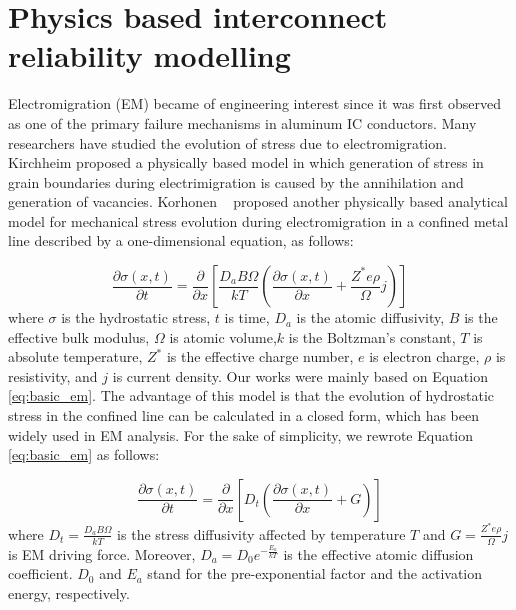 \section{Physics based interconnect reliability modelling} 
\label{sec:reliability_modeling}

Electromigration (EM) became of engineering interest since it was first observed as one of the primary failure mechanisms in aluminum IC conductors. Many researchers have studied the evolution of stress due to electromigration. Kirchheim proposed a physically based model in which generation of stress in grain boundaries during electrimigration is caused by the annihilation and generation of vacancies. Korhonen ~\cite{Korhonen:jap1993} proposed another physically based analytical model for mechanical stress evolution during electromigration in a confined metal line described by a one-dimensional equation, as follows:

\begin{equation}
\label{eq:basic_em}
\frac{\partial \sigma(x,t)}{\partial t}=\frac{\partial }{\partial x}\left[\frac{D_aB\Omega}{kT}\left(\frac{\partial \sigma(x,t)}{\partial x}+\frac{Z^*e\rho}{\Omega}j\right)\right]
\end{equation}
where $\sigma$ is the hydrostatic stress, $t$ is time, $D_a$ is the atomic diffusivity, $B$ is the effective bulk modulus, $\Omega$ is atomic volume,$k$ is the Boltzman's constant, $T$ is absolute temperature, $Z^*$ is the effective charge number, $e$ is electron charge, $\rho$ is resistivity, and $j$ is current density. Our works were mainly based on Equation
\eqref{eq:basic_em}. The advantage of this model is that the evolution of hydrostatic stress in the confined line can be calculated in a closed form, which has been widely used in EM analysis. For the sake of simplicity, we rewrote Equation \eqref{eq:basic_em} as follows:

\begin{equation}
\label{eq:basic_em_s}
\frac{\partial \sigma(x,t)}{\partial t}=\frac{\partial }{\partial x}\left[D_t\left(\frac{\partial \sigma(x,t)}{\partial x}+G\right)\right]
\end{equation}
where $D_t=\frac{D_aB\Omega}{kT}$ is the stress diffusivity affected by temperature $T$ and $G=\frac{Z^*e\rho}{\Omega}j$ is EM driving force. Moreover, $D_a=D_0e^{-\frac{E_a}{kT}}$ is the effective atomic diffusion coefficient. $D_0$ and $E_a$ stand for the pre-exponential factor and the activation energy, respectively.

